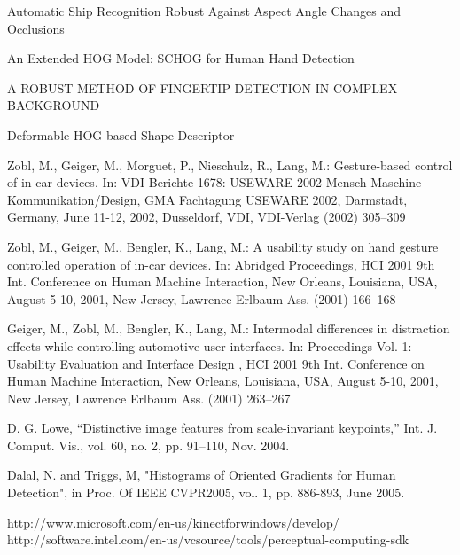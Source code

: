 \documentclass[a4paper,11pt,oneside]{book}
\begin{document}
\begin{thebibliography}{2}
 Automatic Ship Recognition Robust Against Aspect Angle Changes and Occlusions

 An Extended HOG Model: SCHOG for Human Hand Detection

 A ROBUST METHOD OF FINGERTIP DETECTION IN COMPLEX BACKGROUND

 Deformable HOG-based Shape Descriptor

 Zobl, M., Geiger, M., Morguet, P., Nieschulz, R., Lang, M.: Gesture-based control of in-car devices. In: VDI-Berichte 1678: USEWARE 2002 Mensch-Maschine-Kommunikation/Design, GMA Fachtagung USEWARE 2002, Darmstadt, Germany, June 11-12, 2002, Dusseldorf, VDI, VDI-Verlag (2002) 305–309

 Zobl, M., Geiger, M., Bengler, K., Lang, M.: A usability study on hand gesture controlled operation of in-car devices. In: Abridged Proceedings, HCI 2001 9th Int. Conference on Human Machine Interaction, New Orleans, Louisiana, USA, August 5-10, 2001, New Jersey, Lawrence Erlbaum Ass. (2001) 166–168

 Geiger, M., Zobl, M., Bengler, K., Lang, M.: Intermodal differences in distraction effects while controlling automotive user interfaces. In: Proceedings Vol. 1: Usability Evaluation and Interface Design , HCI 2001 9th Int. Conference on Human Machine Interaction, New Orleans, Louisiana, USA, August 5-10, 2001, New Jersey, Lawrence Erlbaum Ass. (2001) 263–267

 D. G. Lowe, “Distinctive image features from scale-invariant keypoints,” Int. J. Comput. Vis., vol. 60, no. 2, pp. 91–110, Nov. 2004. 

 Dalal, N. and Triggs, M, "Histograms of Oriented Gradients for Human Detection", in Proc. Of IEEE CVPR2005, vol. 1, pp. 886-893, June 2005.

 http://www.microsoft.com/en-us/kinectforwindows/develop/
 http://software.intel.com/en-us/vcsource/tools/perceptual-computing-sdk

\end{thebibliography}
\end{document}

